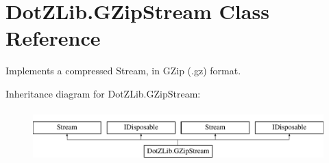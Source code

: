 \hypertarget{class_dot_z_lib_1_1_g_zip_stream}{}\section{Dot\+Z\+Lib.\+G\+Zip\+Stream Class Reference}
\label{class_dot_z_lib_1_1_g_zip_stream}


Implements a compressed Stream, in G\+Zip (.gz) format.  


Inheritance diagram for Dot\+Z\+Lib.\+G\+Zip\+Stream\+:\begin{figure}[H]
\begin{center}
\leavevmode
\includegraphics[height=2.000000cm]{class_dot_z_lib_1_1_g_zip_stream}
\end{center}
\end{figure}
